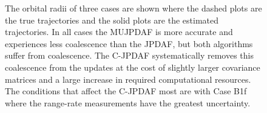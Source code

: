 \documentclass[letterpaper, paper,10pt]{AAS}		%
\begin{document}
\begin{figure}
{
\centerline{
	}
\centerline{
	}
\centerline{
	}
}
\caption{The orbital radii of three cases are shown where the dashed plots are the true trajectories and the solid plots are the estimated trajectories.
In all cases the MUJPDAF is more accurate and experiences less coalescence than the JPDAF, but both algorithms suffer from coalescence.
The C-JPDAF systematically removes this coalescence from the updates at the cost of slightly larger covariance matrices and a large increase in required computational resources.
The conditions that affect the C-JPDAF most are with Case B1f where the range-rate measurements have the greatest uncertainty.
}\label{fig:B1}
\end{figure}
\end{document}
